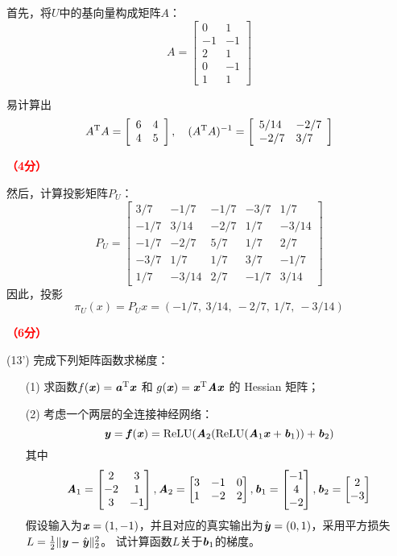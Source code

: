 \documentclass[12pt,a4paper,openany,twoside]{ctexbook}
\begin{document}
\begin{Solution}
首先，将$U$中的基向量构成矩阵$A$：
\[
A=\left[\begin{array}{ll}
	0 & 1 \\
	-1 & -1 \\
	2 & 1 \\
	0 & -1 \\
	1 & 1 
\end{array}\right]
\]

易计算出
\[
A^{\mathrm{T}} A=\left[\begin{array}{ll}
	6 & 4 \\
	4 & 5 
\end{array}\right], \quad
(A^{\mathrm{T}} A)^{-1}=\left[\begin{array}{ll}
	5/14 & -2/7 \\
	-2/7 & 3/7 
\end{array}\right]
\]

\hfill \textcolor{red}{\textbf{（4分）}}
 
然后，计算投影矩阵$P_U$：
\[
P_U=\left[\begin{array}{ccccc}
	3/7 & -1/7 & -1/7 & -3/7 & 1/7 \\
	-1/7 & 3/14 & -2/7 & 1/7 & -3/14 \\
	-1/7 & -2/7 & 5/7 & 1/7 & 2/7 \\
	-3/7 & 1/7 & 1/7 & 3/7 & -1/7 \\
	1/7 & -3/14 & 2/7 & -1/7 & 3/14 
\end{array}\right]
\]
因此，投影
\[
\pi_U(x) = P_U x = (-1/7, ~ 3/14, ~ -2/7, ~ 1/7, ~ -3/14)
\]

\hfill \textcolor{red}{\textbf{（6分）}}
	
\end{Solution}




\begin{exercise}(13')
	完成下列矩阵函数求梯度：
	\begin{itemize}
		\item [(1)] 求函数$f(\boldsymbol{\mathit{x}})=\boldsymbol{\mathit{a}}^{\mathrm{T}} \boldsymbol{\mathit{x}}$ 和 $g(\boldsymbol{\mathit{x}})=\boldsymbol{\mathit{x}}^{\mathrm{T}} \boldsymbol{\mathit{A}} \boldsymbol{\mathit{x}}$ 的 Hessian 矩阵；
		\item [(2)] 考虑一个两层的全连接神经网络：
		\[
		\boldsymbol{\mathit{y}}=\boldsymbol{\mathit{f}}(\boldsymbol{\mathit{x}})=\mathrm{ReLU}(\boldsymbol{\mathit{A}}_2(\mathrm{ReLU}(\boldsymbol{\mathit{A}}_1\boldsymbol{\mathit{x}}+\boldsymbol{\mathit{b}}_1))+\boldsymbol{\mathit{b}}_2)	
		\]
		其中\[
		\boldsymbol{\mathit{A}}_1=\begin{bmatrix}
			2&3\\
			-2&1\\
			3&-1
		\end{bmatrix}	,\boldsymbol{\mathit{A}}_2=\begin{bmatrix}
			3&-1&0\\
			1&-2&2
		\end{bmatrix},\boldsymbol{\mathit{b}}_1=\begin{bmatrix}
			-1\\4\\-2
		\end{bmatrix},\boldsymbol{\mathit{b}}_2=\begin{bmatrix}
			2\\-3
		\end{bmatrix}
		\]
		假设输入为$\boldsymbol{\mathit{x}}=(1,-1)$，并且对应的真实输出为$\hat{\boldsymbol{\mathit{y}}}=(0,1)$，采用平方损失$L=\frac12\|\boldsymbol{\mathit{y}}-\hat{\boldsymbol{\mathit{y}}}\|_2^2$。
		试计算函数$L$关于$\boldsymbol{\mathit{b}}_1$的梯度。
	\end{itemize}
\end{exercise}
\end{document}
